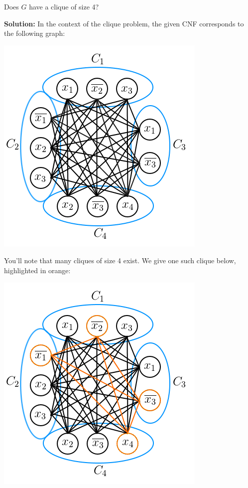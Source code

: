 \documentclass{article}
\begin{document}
Does $G$ have a clique of size 4?
\newpage

\noindent\textbf{Solution:} In the context of the clique problem, the given CNF corresponds to the following graph:
\begin{center}
  \includegraphics[scale=.8]{clique.png}
\end{center}

You'll note that many cliques of size 4 exist. We give one such clique below, highlighted in orange:
\begin{center}
  \includegraphics[scale=.8]{clique2.png}
\end{center}
\end{document}
